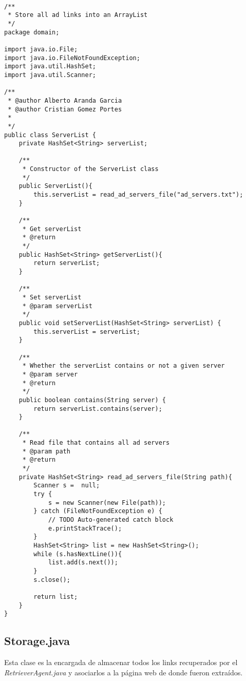 \documentclass{pre-tfg}
\begin{document}
\begin{lstlisting}[caption=Código de lectura e inserción de dominios de anuncios,style=java]

/**
 * Store all ad links into an ArrayList
 */
package domain;

import java.io.File;
import java.io.FileNotFoundException;
import java.util.HashSet;
import java.util.Scanner;

/**
 * @author Alberto Aranda Garcia
 * @author Cristian Gomez Portes
 *
 */
public class ServerList {
	private HashSet<String> serverList;
	
	/**
	 * Constructor of the ServerList class
	 */
	public ServerList(){
		this.serverList = read_ad_servers_file("ad_servers.txt");
	}
	
	/**
	 * Get serverList
	 * @return
	 */
	public HashSet<String> getServerList(){
		return serverList;
	}
	
	/**
	 * Set serverList
	 * @param serverList
	 */
	public void setServerList(HashSet<String> serverList) {
		this.serverList = serverList;
	}
	
	/**
	 * Whether the serverList contains or not a given server
	 * @param server
	 * @return
	 */
	public boolean contains(String server) {
		return serverList.contains(server);
	}
	
	/**
	 * Read file that contains all ad servers
	 * @param path
	 * @return
	 */
	private HashSet<String> read_ad_servers_file(String path){
		Scanner s =  null;
		try {
			s = new Scanner(new File(path));
		} catch (FileNotFoundException e) {
			// TODO Auto-generated catch block
			e.printStackTrace();
		}
		HashSet<String> list = new HashSet<String>();
		while (s.hasNextLine()){
		    list.add(s.next());
		}
		s.close();
		
		return list;
	}
}

\end{lstlisting}

\subsection{Storage.java}

Esta clase es la encargada de almacenar todos los links recuperados por el \textit{RetrieverAgent.java} y asociarlos a la página web
de donde fueron extraídos.
\end{document}
